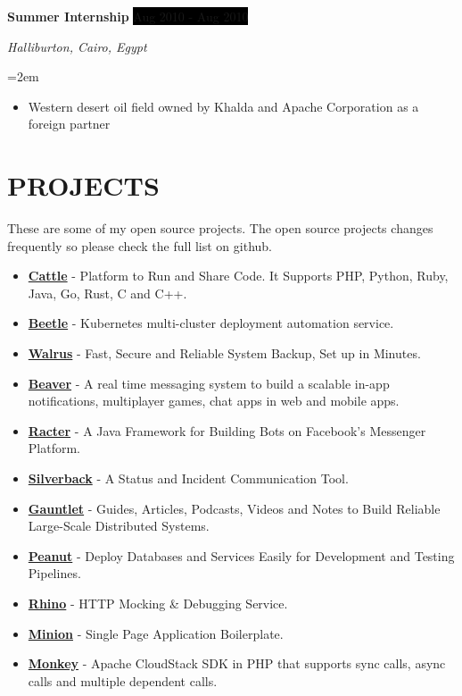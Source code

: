 \documentclass[paper=a4,fontsize=11pt]{scrartcl} %
\newcommand{\NewPart}[1]{\section*{\uppercase{#1}}}
\newcommand{\EducationEntry}[4]{
		\noindent \textbf{#1} \hfill      %
		\colorbox{Black}{%
			\parbox{6em}{%
			\hfill\color{White}#2}} \par  %
		\noindent \textit{#3} \par        %
		\noindent\hangindent=2em\hangafter=0 \small #4 %
		\normalsize \par}
\newcommand{\WorkEntry}[4]{				  %
		\noindent \textbf{#1} \hfill      %
		\colorbox{Black}{\color{White}#2} \par  %
		\noindent \textit{#3} \par              %
		\noindent\hangindent=2em\hangafter=0 \small #4 %
		\normalsize \par}
\begin{document}
\WorkEntry{Summer Internship}{Aug 2010 - Aug 2010}{Halliburton, Cairo, Egypt}{\begin{itemize}
\item Western desert oil field owned by Khalda and Apache Corporation as a foreign partner
\end{itemize}}


\NewPart{Projects}{}

These are some of my open source projects. The open source projects changes frequently so please check the full list on github.

\begin{itemize}
\item \textbf{\href{https://github.com/Clivern/Cattle}{Cattle}} - Platform to Run and Share Code. It Supports PHP, Python, Ruby, Java, Go, Rust, C and C++.
\item \textbf{\href{https://github.com/Clivern/Beetle}{Beetle}} - Kubernetes multi-cluster deployment automation service.
\item \textbf{\href{https://github.com/Clivern/Walrus}{Walrus}} - Fast, Secure and Reliable System Backup, Set up in Minutes.
\item \textbf{\href{https://github.com/Clivern/Beaver}{Beaver}} - A real time messaging system to build a scalable in-app notifications, multiplayer games, chat apps in web and mobile apps.
\item \textbf{\href{https://github.com/Clivern/Racter}{Racter}} - A Java Framework for Building Bots on Facebook's Messenger Platform.
\item \textbf{\href{https://github.com/silverbackhq}{Silverback}} - A Status and Incident Communication Tool.
\item \textbf{\href{https://github.com/Clivern/Gauntlet}{Gauntlet}} - Guides, Articles, Podcasts, Videos and Notes to Build Reliable Large-Scale Distributed Systems.
\item \textbf{\href{https://github.com/Clivern/Peanut}{Peanut}} - Deploy Databases and Services Easily for Development and Testing Pipelines.
\item \textbf{\href{https://github.com/Clivern/Rhino}{Rhino}} - HTTP Mocking \& Debugging Service.
\item \textbf{\href{https://github.com/Clivern/Minion}{Minion}} - Single Page Application Boilerplate.
\item \textbf{\href{https://github.com/Clivern/Monkey}{Monkey}} - Apache CloudStack SDK in PHP that supports sync calls, async calls and multiple dependent calls.

\end{itemize}
\end{document}
